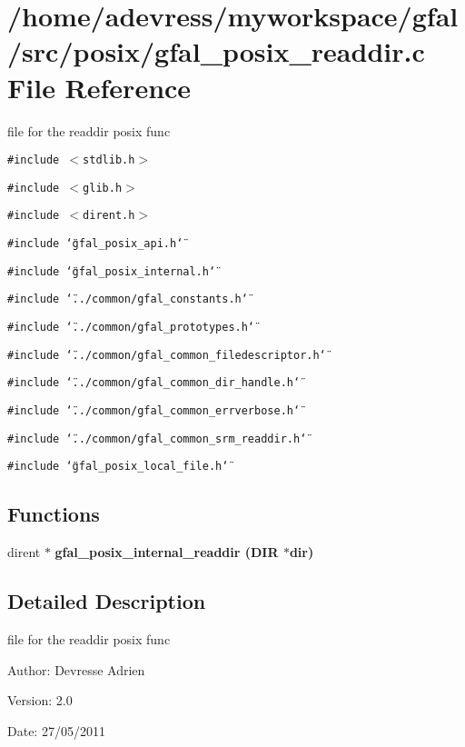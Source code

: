 \section{/home/adevress/myworkspace/gfal/src/posix/gfal\_\-posix\_\-readdir.c File Reference}
\label{gfal__posix__readdir_8c}
file for the readdir posix func 

{\tt \#include $<$stdlib.h$>$}\par
{\tt \#include $<$glib.h$>$}\par
{\tt \#include $<$dirent.h$>$}\par
{\tt \#include \char`\"{}gfal\_\-posix\_\-api.h\char`\"{}}\par
{\tt \#include \char`\"{}gfal\_\-posix\_\-internal.h\char`\"{}}\par
{\tt \#include \char`\"{}../common/gfal\_\-constants.h\char`\"{}}\par
{\tt \#include \char`\"{}../common/gfal\_\-prototypes.h\char`\"{}}\par
{\tt \#include \char`\"{}../common/gfal\_\-common\_\-filedescriptor.h\char`\"{}}\par
{\tt \#include \char`\"{}../common/gfal\_\-common\_\-dir\_\-handle.h\char`\"{}}\par
{\tt \#include \char`\"{}../common/gfal\_\-common\_\-errverbose.h\char`\"{}}\par
{\tt \#include \char`\"{}../common/gfal\_\-common\_\-srm\_\-readdir.h\char`\"{}}\par
{\tt \#include \char`\"{}gfal\_\-posix\_\-local\_\-file.h\char`\"{}}\par
\subsection*{Functions}
\begin{CompactItemize}
\item 
dirent $\ast$ \bf{gfal\_\-posix\_\-internal\_\-readdir} (DIR $\ast$dir)
\end{CompactItemize}


\subsection{Detailed Description}
file for the readdir posix func 

\begin{Desc}
\item[Author:]Devresse Adrien \end{Desc}
\begin{Desc}
\item[Version:]2.0 \end{Desc}
\begin{Desc}
\item[Date:]27/05/2011 \end{Desc}


